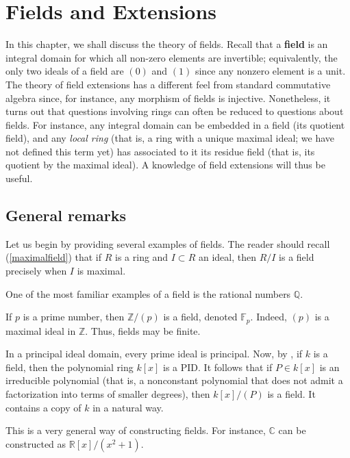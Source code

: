 \chapter{Fields and Extensions}

In this chapter, we shall discuss the theory of fields.
Recall that a \textbf{field} is an integral domain for which all non-zero elements are
invertible; equivalently, the only two ideals of a field are $(0)$ and $(1)$
since any nonzero element is a unit. 
The theory of field extensions has a different feel from standard commutative
algebra since, for instance, any morphism of fields is injective. Nonetheless,
it turns out that questions involving rings can often be reduced to questions
about fields. For instance, any integral domain can be embedded in a field
(its quotient field), and any \emph{local ring} (that is, a ring with a unique
maximal ideal; we have not defined this term yet) has associated to it its
residue field (that is, its quotient by the maximal ideal).
A knowledge of field extensions will thus be useful.


\section{General remarks}
Let us begin by providing several examples of fields. The reader should
recall (\cref{maximalfield}) that if $R$ is a ring and $I \subset R$ an
ideal, then $R/I$ is a field precisely when $I$ is maximal.

\begin{example}
One of the most familiar examples of a field is the rational
numbers $\mathbb{Q}$.
\end{example}

\begin{example}
If $p$ is a prime number, then $\mathbb{Z}/(p)$ is a field, denoted
$\mathbb{F}_p$. Indeed, $(p)$ is a
maximal ideal in $\mathbb{Z}$. Thus, fields may be finite.  
\end{example}


\begin{example} 
In a principal ideal domain, every prime ideal is principal. Now, by
, if $k$ is a field, then the polynomial ring $k[x]$ is a PID. 
It follows that if $P \in k[x]$ is an irreducible polynomial (that is, a
nonconstant polynomial
that does not admit a factorization into terms of smaller degrees), then
$k[x]/(P)$ is a field. It contains a copy of $k$ in a natural way.

This is a very general way of constructing fields. For instance, $\mathbb{C}$
can be constructed as $\mathbb{R}[x]/(x^2 + 1)$.
\end{example} 

